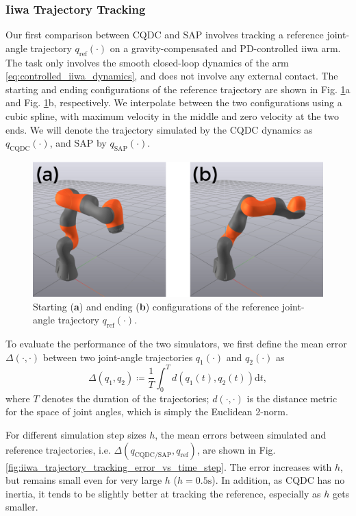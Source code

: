\subsubsection{Iiwa Trajectory Tracking}
Our first comparison between CQDC and SAP involves tracking a reference joint-angle trajectory $q_\mathrm{ref}(\cdot)$ on a gravity-compensated and PD-controlled iiwa arm. The task only involves the smooth closed-loop dynamics of the arm \eqref{eq:controlled_iiwa_dynamics}, and does not involve any external contact. The starting and ending configurations of the reference trajectory are shown in Fig. \ref{fig:iiwa_trajectory_tracking}a and Fig. \ref{fig:iiwa_trajectory_tracking}b, respectively. We interpolate between the two configurations using a cubic spline, with maximum velocity in the middle and zero velocity at the two ends. We will denote the trajectory simulated by the CQDC dynamics as $q_\mathrm{CQDC}(\cdot)$, and SAP by $q_\mathrm{SAP}(\cdot)$.

\begin{figure}[h]
\centering
\includegraphics[width=0.70\linewidth]{figures/02_quasi_static_dynamics/iiwa_trajectory_tracking.png}
\caption{Starting (\textbf{a}) and ending (\textbf{b}) configurations of the reference joint-angle trajectory $q_\mathrm{ref}(\cdot)$.}
\label{fig:iiwa_trajectory_tracking}
\end{figure}

To evaluate the performance of the two simulators, we first define the mean error $\Delta(\cdot,\cdot)$ between two joint-angle trajectories $q_\mathrm{1}(\cdot)$ and $q_\mathrm{2}(\cdot)$ as
\begin{equation}
\label{eq:mean_trajectory_error}
\Delta(q_\mathrm{1}, q_\mathrm{2}) \coloneqq 
\frac{1}{T}
\int^T_{0} d(q_\mathrm{1}(t), q_\mathrm{2}(t))\mathrm{d}t,
\end{equation}
where $T$ denotes the duration of the trajectories; $d(\cdot, \cdot)$ is the distance metric for the space of joint angles, which is simply the Euclidean 2-norm.

For different simulation step sizes $h$, the mean errors between simulated and reference trajectories, i.e. $\Delta(q_\mathrm{CQDC/SAP}, q_\mathrm{ref})$, are shown in Fig. \ref{fig:iiwa_trajectory_tracking_error_vs_time_step}. The error increases with $h$, but remains small even for very large $h$ ($h=0.5\mathrm{s}$). In addition, as CQDC has no inertia, it tends to be slightly better at tracking the reference, especially as $h$ gets smaller.

